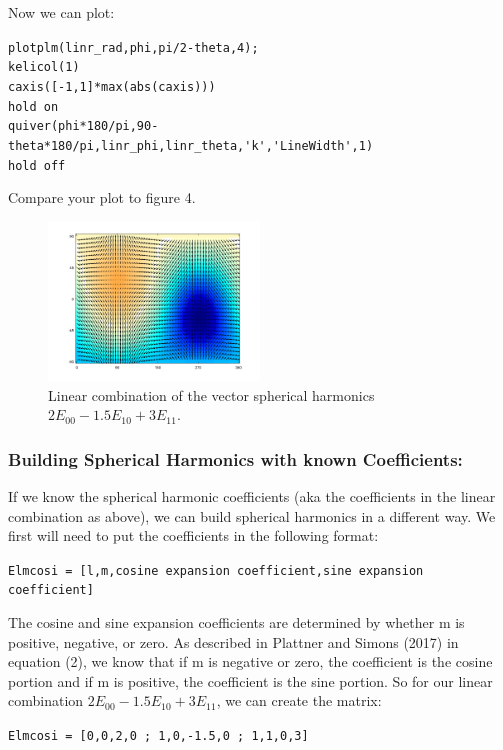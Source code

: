 \documentclass[11pt]{article}
\begin{document}
Now we can plot:

\verb|plotplm(linr_rad,phi,pi/2-theta,4);|\\
\verb|kelicol(1)|\\
\verb|caxis([-1,1]*max(abs(caxis)))|\\
\verb|hold on|\\
\verb|quiver(phi*180/pi,90-theta*180/pi,linr_phi,linr_theta,'k','LineWidth',1)|\\
\verb|hold off|

Compare your plot to figure 4.

\begin{figure}[H]
  \centering
  \includegraphics[width=0.5\textwidth]{figures_Rep2/lincomb1.png}  
  \caption{Linear combination of the vector spherical harmonics $2E_{00}-1.5E_{10}+3E_{11}$.}
\label{E_comb}
\end{figure}

\subsubsection{Building Spherical Harmonics with known Coefficients:}

If we know the spherical harmonic coefficients (aka the coefficients in the linear combination as above), we can build spherical harmonics in a different way. We first will need to put the coefficients in the following format:

\verb|Elmcosi = [l,m,cosine expansion coefficient,sine expansion coefficient]|

The cosine and sine expansion coefficients are determined by whether m is positive, negative, or zero.  As described in Plattner and Simons (2017) in equation (2), we know that if m is negative or zero, the coefficient is the cosine portion and if m is positive, the coefficient is the sine portion.  So for our linear combination $2E_{00}-1.5E_{10}+3E_{11}$, we can create the matrix:

\verb|Elmcosi = [0,0,2,0 ; 1,0,-1.5,0 ; 1,1,0,3]|
\end{document}
